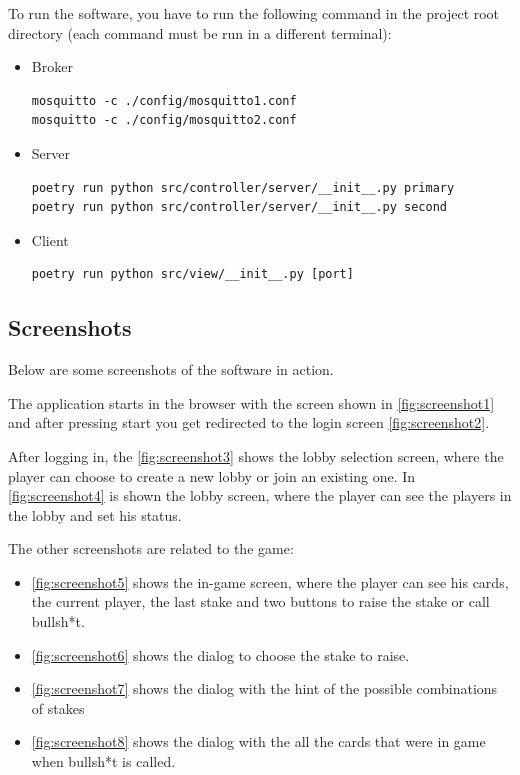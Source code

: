 \documentclass{scrartcl}
\begin{document}
To run the software, you have to run the following command in the project root directory 
(each command must be run in a different terminal):
\begin{itemize}
      \item Broker
            \begin{verbatim}
mosquitto -c ./config/mosquitto1.conf
mosquitto -c ./config/mosquitto2.conf
            \end{verbatim}
      \item Server
            \begin{verbatim}
poetry run python src/controller/server/__init__.py primary
poetry run python src/controller/server/__init__.py second
            \end{verbatim}
      \item Client
            \begin{verbatim}
poetry run python src/view/__init__.py [port]
            \end{verbatim}
\end{itemize}

\subsection{Screenshots}\label{screenshots}
Below are some screenshots of the software in action.

The application starts in the browser with the screen shown in \cref{fig:screenshot1}
and after pressing start you get redirected to the login screen \cref{fig:screenshot2}.

After logging in, the \cref{fig:screenshot3} shows the lobby selection screen, where the player can 
choose to create a new lobby or join an existing one. In \cref{fig:screenshot4} is shown the 
lobby screen, where the player can see the players in the lobby and set his status.

The other screenshots are related to the game:
\begin{itemize}
      \item \cref{fig:screenshot5} shows the in-game screen, where the player can see his cards, the 
            current player, the last stake and two buttons to raise the stake or call bullsh*t.
      \item \cref{fig:screenshot6} shows the dialog to choose the stake to raise.
      \item \cref{fig:screenshot7} shows the dialog with the hint of the possible combinations of 
            stakes
      \item \cref{fig:screenshot8} shows the dialog with the all the cards that were in game 
            when bullsh*t is called.
\end{itemize}
\end{document}
